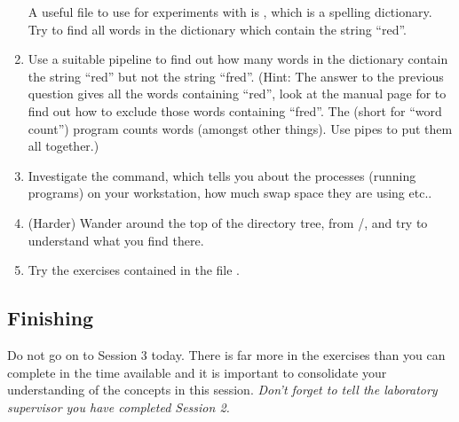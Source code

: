 \begin{enumerate}
A useful file to use for experiments with  is
, which is a spelling dictionary. Try to
find all words 
in the dictionary which contain the string ``red''.
\item 
  Use a suitable pipeline to find out how many
  words in the dictionary contain the string ``red'' but not the
  string ``fred''.  (Hint: The answer to the previous question gives all
  the words containing ``red'', look at the manual page for
   to find out how to exclude those words containing
  ``fred''. The  (short for ``word count'') program counts words
  (amongst other things). Use pipes to put them all together.)
\item Investigate the  command, which tells you about the
  processes (running programs) on your workstation, how much swap
  space they are using etc..
\item (Harder) Wander around the top of the directory tree, from /,
  and try to understand what you find there.
\item Try the exercises contained in the file .
\end{enumerate}

\subsection{Finishing}
Do not go on to Session 3 today. There is far more in the exercises
than you can complete in the time available and it is important to
consolidate your understanding of the concepts in this session. \emph{Don't
forget to tell the laboratory supervisor you have completed Session 2.}


